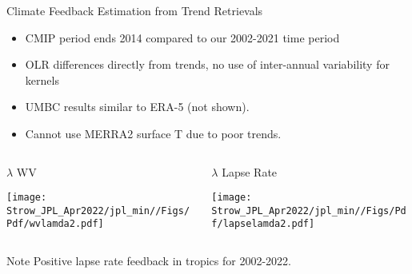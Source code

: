 \documentclass[10pt,t]{beamer}
\begin{document}

\begin{frame}[label={sec:orgf7f9de9}]{Climate Feedback Estimation from Trend Retrievals}
\vspace{-0.15in}
\small
\begin{itemize}
\item CMIP period ends 2014 compared to our 2002-2021 time period
\item OLR differences directly from trends, no use of inter-annual variability for kernels
\item UMBC results similar to ERA-5 (not shown).
\item Cannot use MERRA2 surface T due to poor trends.
\end{itemize}

\vspace{-0.25in}
\begin{columns}
\begin{column}{0.5\columnwidth}
\begin{block}{\(\lambda\) WV}
\vspace{-0.1in}
\begin{center}
\texttt{[image: Strow\_JPL\_Apr2022/jpl\_min//Figs/Pdf/wvlamda2.pdf]}
\end{center}
\end{block}
\end{column}


\begin{column}{0.5\columnwidth}
\begin{block}{\(\lambda\) Lapse Rate}
\vspace{-0.1in}
\begin{center}
\texttt{[image: Strow\_JPL\_Apr2022/jpl\_min//Figs/Pdf/lapselamda2.pdf]}
\end{center}
\end{block}
\end{column}
\end{columns}

\vspace{-0.05in}
Note Positive lapse rate feedback in tropics for 2002-2022.
\end{frame}
\end{document}
